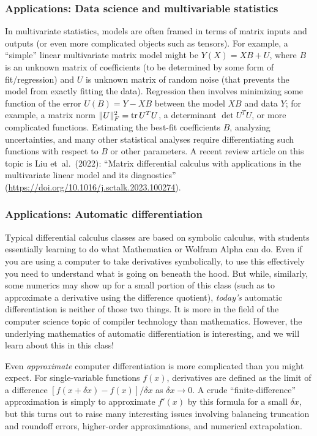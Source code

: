 \subsubsection*{Applications: Data science and multivariable statistics}

In multivariate statistics, models are often framed in terms of matrix inputs and outputs (or even more complicated objects such as tensors).  For example, a ``simple'' linear multivariate matrix model might be $Y(X) = XB + U$, where $B$ is an unknown matrix of coefficients (to be determined by some form of fit/regression) and $U$ is unknown matrix of random noise (that prevents the model from exactly fitting the data).  Regression then involves minimizing some function of the error $U(B) = Y - XB$ between the model $XB$ and data $Y$; for example, a matrix norm $\Vert U\Vert_F^2 = \operatorname{tr} U^T U$, a determinant $\det U^T U$, or more complicated functions.  Estimating the best-fit coefficients $B$, analyzing uncertainties, and many other statistical analyses require differentiating such functions with respect to $B$ or other parameters.  A recent review article on this topic is Liu et~al.~(2022): ``Matrix differential calculus with applications in the multivariate linear model and its diagnostics'' (\url{https://doi.org/10.1016/j.sctalk.2023.100274}).



\subsubsection*{Applications: Automatic differentiation}

Typical differential calculus classes are based on symbolic calculus, with students essentially learning to do what Mathematica or Wolfram Alpha can do. Even if you are using a computer to take derivatives symbolically, to use this effectively you need to understand what is going on beneath the hood. But while, similarly, some numerics may show up for a small portion of this class (such as to approximate a derivative using the difference quotient), \textit{today's} automatic differentiation is neither of those two things. It is more in the field of the computer science topic of compiler technology than mathematics. However, the underlying mathematics of automatic differentiation is interesting, and we will learn about this in this class!

Even \emph{approximate} computer differentiation is more complicated than you might expect.  For single-variable functions $f(x)$, derivatives are defined as the limit of a difference $[f(x+\delta x)-f(x)]/\delta x$ as $\delta x\to 0$.  A crude ``finite-difference'' approximation is simply to approximate $f'(x)$ by this formula for a small $\delta x$, but this turns out to raise many interesting issues involving balancing truncation and roundoff errors, higher-order approximations, and numerical extrapolation.

